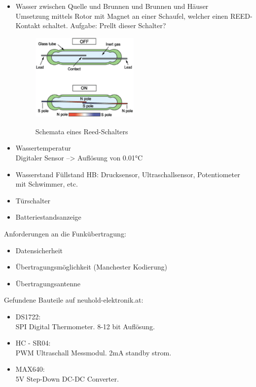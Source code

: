 \documentclass[12pt,a4paper,german]{article}
\begin{document}
\begin{itemize}
	\item{Wasser zwischen Quelle und Brunnen und Brunnen und Häuser} \\
	 Umsetzung mittels Rotor mit Magnet an einer Schaufel, welcher einen
	 REED-Kontakt schaltet. Aufgabe: Prellt dieser Schalter?
	 \begin{figure}[H]
		\centering
		\includegraphics[width=0.5\textwidth]{Reed.png}
		\label{fig:reed}
		\caption{Schemata eines Reed-Schalters}
	\end{figure}

	\item{Wassertemperatur} \\
	Digitaler Sensor --> Auflösung von 0.01°C

	\item{Wasserstand}
	Füllstand HB: Drucksensor, Ultraschallsensor, Potentiometer mit
	Schwimmer, etc.

	\item{Türschalter}
	\item{Batteriestandsanzeige}


\end{itemize}

Anforderungen an die Funkübertragung:
\begin{itemize}
	\item{Datensicherheit}
	\item{Übertragungsmöglichkeit (Manchester Kodierung)}
	\item{Übertragungsantenne}
\end{itemize}

Gefundene Bauteile auf neuhold-elektronik.at:
\begin{itemize}
	\item{DS1722}: \\
	SPI Digital Thermometer. 8-12 bit Auflösung.
	
	\item{HC - SR04}: \\
	PWM Ultraschall Messmodul. 2mA standby strom.
	
	\item{MAX640}: \\
	5V Step-Down DC-DC Converter.

	
\end{itemize}
\end{document}
